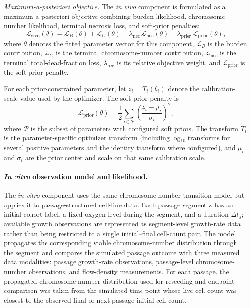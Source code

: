\documentclass[11pt]{article}
\begin{document}
\underline{\textit{Maximum-a-posteriori objective.}} The \textit{in vivo} component is formulated as a maximum-a-posteriori objective combining burden likelihood, chromosome-number likelihood, terminal necrosis loss, and soft-prior penalties:
\begin{equation}
\mathcal L_{\mathrm{vivo}}(\theta)
=
\mathcal L_B(\theta)
+ 
\mathcal L_C(\theta)
+
\lambda_{\mathrm{nec}}
\,
\mathcal L_{\mathrm{nec}}(\theta)
+ 
\lambda_{\mathrm{prior}}
\,
\mathcal L_{\mathrm{prior}}(\theta),
\label{eq:appendix_objective}
\end{equation}
where $\theta$ denotes the fitted parameter vector for this component, $\mathcal L_B$ is the burden contribution, $\mathcal L_C$ is the terminal chromosome-number contribution, $\mathcal L_{\mathrm{nec}}$ is the terminal total-dead-fraction loss, $\lambda_{\mathrm{nec}}$ is its relative objective weight, and $\mathcal L_{\mathrm{prior}}$ is the soft-prior penalty.


For each prior-constrained parameter, let $z_i=T_i(\theta_i)$ denote the calibration-scale value used by the optimizer. The soft-prior penalty is
\begin{equation}
\mathcal{L}_{\mathrm{prior}}(\theta)
=
\frac{1}{2}
\sum_{i \in \mathcal{P}}
\left(
\frac{z_i - \mu_i}{\sigma_i}
\right)^2 ,
\label{eq:prior_penalty}
\end{equation}
where $\mathcal{P}$ is the subset of parameters with configured soft priors. The transform $T_i$ is the parameter-specific optimizer transform (including log$_{10}$ transforms for several positive parameters and the identity transform where configured), and $\mu_i$ and $\sigma_i$ are the prior center and scale on that same calibration scale.

\paragraph{\textit{In vitro} observation model and likelihood.}

The \textit{in vitro} component uses the same chromosome-number transition model but applies it to passage-structured cell-line data. Each passage segment $s$ has an initial cohort label, a fixed oxygen level during the segment, and a duration $\Delta t_s$; available growth observations are represented as segment-level growth-rate data rather than being restricted to a single initial--final cell-count pair. The model propagates the corresponding viable chromosome-number distribution through the segment and compares the simulated passage outcome with three measured data modalities: passage growth-rate observations, passage-level chromosome-number observations, and flow-density measurements. For each passage, the propagated chromosome-number distribution used for reseeding and endpoint comparison was taken from the simulated time point whose live-cell count was closest to the observed final or next-passage initial cell count.
\end{document}
